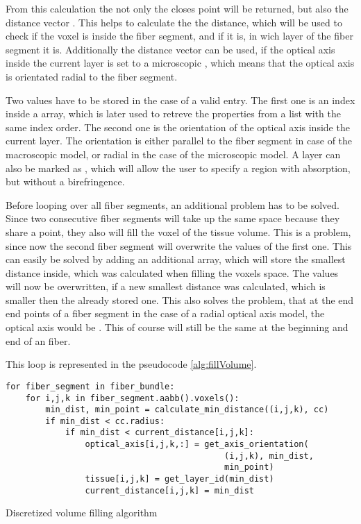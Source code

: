 From this calculation the not only the closes point \dummy{} will be returned, but also the distance vector \dummy{}. 
This helps to calculate the the distance, which will be used to check if the voxel is inside the fiber segment, and if it is, in wich layer of the fiber segment it is.
Additionally the distance vector can be used, if the optical axis inside the current layer is set to a microscopic \dummy{}, which means that the optical axis is orientated radial to the fiber segment.
\par
% 
Two values have to be stored in the case of a valid entry.
The first one is an index inside a  array, which is later used to retreve the properties from a list with the same index order.
The second one is the orientation of the optical axis inside the current layer.
The orientation is either parallel to the fiber segment in case of the macroscopic model, or radial in the case of the microscopic model.
A layer can also be marked as , which will allow the user to specify a region with absorption, but without a birefringence.
\par
% 
Before looping over all fiber segments, an additional problem has to be solved.
Since two consecutive fiber segments will take up the same space because they share a point, they also will fill the voxel of the tissue volume.
This is a problem, since now the second fiber segment will overwrite the values of the first one.
This can easily be solved by adding an additional array, which will store the smallest distance inside, which was calculated when filling the voxels space.
The values will now be overwritten, if a new smallest distance was calculated, which is smaller then the already stored one.
This also solves the problem, that at the end end points of a fiber segment in the case of a radial optical axis model, the optical axis would be .
This of course will still be the same at the beginning and end of an fiber.
\par
% 
This  loop is represented in the pseudocode \cref{alg:fillVolume}.
% 
\begin{lstfloat}[!tb]
\lstset{style=python}
\begin{lstlisting}[]
for fiber_segment in fiber_bundle:
    for i,j,k in fiber_segment.aabb().voxels():
        min_dist, min_point = calculate_min_distance((i,j,k), cc)
        if min_dist < cc.radius:
            if min_dist < current_distance[i,j,k]:
                optical_axis[i,j,k,:] = get_axis_orientation(
                                            (i,j,k), min_dist,
                                            min_point)
                tissue[i,j,k] = get_layer_id(min_dist)
                current_distance[i,j,k] = min_dist
\end{lstlisting}
\caption{Discretized volume filling algorithm}
\label{alg:fillVolume}
\end{lstfloat}
%
% 
% 
% 

